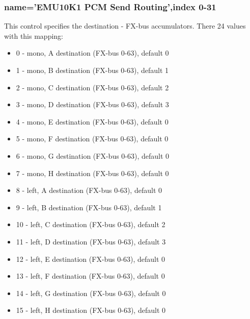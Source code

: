 \documentclass[a4paper,8pt,english]{sphinxmanual}
\begin{document}
\subsubsection{name='EMU10K1 PCM Send Routing',index 0-31}
\label{sound/cards/audigy-mixer:name-emu10k1-pcm-send-routing-index-0-31}
This control specifies the destination - FX-bus accumulators. There 24
values with this mapping:
\begin{itemize}
\item {} 
0 -  mono, A destination (FX-bus 0-63), default 0

\item {} 
1 -  mono, B destination (FX-bus 0-63), default 1

\item {} 
2 -  mono, C destination (FX-bus 0-63), default 2

\item {} 
3 -  mono, D destination (FX-bus 0-63), default 3

\item {} 
4 -  mono, E destination (FX-bus 0-63), default 0

\item {} 
5 -  mono, F destination (FX-bus 0-63), default 0

\item {} 
6 -  mono, G destination (FX-bus 0-63), default 0

\item {} 
7 -  mono, H destination (FX-bus 0-63), default 0

\item {} 
8 -  left, A destination (FX-bus 0-63), default 0

\item {} 
9 -  left, B destination (FX-bus 0-63), default 1

\item {} 
10 -  left, C destination (FX-bus 0-63), default 2

\item {} 
11 -  left, D destination (FX-bus 0-63), default 3

\item {} 
12 -  left, E destination (FX-bus 0-63), default 0

\item {} 
13 -  left, F destination (FX-bus 0-63), default 0

\item {} 
14 -  left, G destination (FX-bus 0-63), default 0

\item {} 
15 -  left, H destination (FX-bus 0-63), default 0


\end{itemize}
\end{document}
